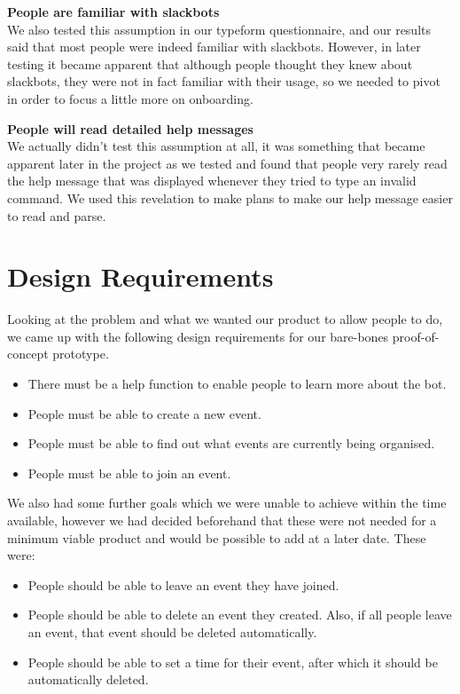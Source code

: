 \documentclass[12pt]{report}
\begin{document}
\vspace{3mm}

\textbf{People are familiar with slackbots}\\
We also tested this assumption in our typeform questionnaire, and our results said that most people were indeed familiar with slackbots. However, in later testing it became apparent that although people thought they knew about slackbots, they were not in fact familiar with their usage, so we needed to pivot in order to focus a little more on onboarding.

\vspace{3mm}

\textbf{People will read detailed help messages}\\
We actually didn't test this assumption at all, it was something that became apparent later in the project as we tested and found that people very rarely read the help message that was displayed whenever they tried to type an invalid command. We used this revelation to make plans to make our help message easier to read and parse.

\section{Design Requirements}\label{desreqs}
Looking at the problem and what we wanted our product to allow people to do, we came up with the following design requirements for our bare-bones proof-of-concept prototype.

\begin{itemize}
	\item There must be a help function to enable people to learn more about the bot.
	\item People must be able to create a new event.
	\item People must be able to find out what events are currently being organised.
	\item People must be able to join an event.
\end{itemize}

We also had some further goals which we were unable to achieve within the time available, however we had decided beforehand that these were not needed for a minimum viable product and would be possible to add at a later date. These were:

\begin{itemize}
	\item People should be able to leave an event they have joined.
	\item People should be able to delete an event they created. Also, if all people leave an event, that event should be deleted automatically.
	\item People should be able to set a time for their event, after which it should be automatically deleted.
\end{itemize}
\end{document}
